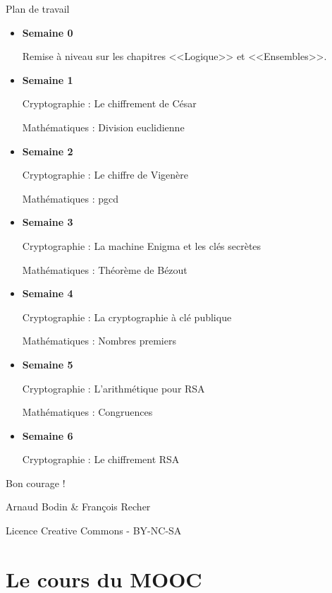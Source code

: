 {\bigskip

Plan de travail
\begin{itemize}
  \item \textbf{\color{blue} Semaine 0} 
  
  Remise à niveau sur les chapitres <<Logique>> et <<Ensembles>>.
  
  \item \textbf{\color{blue} Semaine 1} 
  
  Cryptographie : Le chiffrement de César
  
  Mathématiques : Division euclidienne
  
  \item \textbf{\color{blue} Semaine 2} 
  
  Cryptographie : Le chiffre de Vigenère
  
  Mathématiques : pgcd
  
  \item \textbf{\color{blue} Semaine 3}
  
  Cryptographie : La machine Enigma et les clés secrètes
  
  Mathématiques : Théorème de Bézout 
  
  \item \textbf{\color{blue} Semaine 4}
  
  Cryptographie : La cryptographie à clé publique
  
  Mathématiques : Nombres premiers  
  
  \item \textbf{\color{blue} Semaine 5}
  
  Cryptographie : L'arithmétique pour RSA
  
  Mathématiques : Congruences  
  
  \item \textbf{\color{blue} Semaine 6}
  
  Cryptographie : Le chiffrement RSA

\end{itemize}

\bigskip
\bigskip
\bigskip

\hfil\hfil Bon courage ! 

\hfil\hfil Arnaud Bodin \& François Recher

}%

\vfill
\centerline{Licence Creative Commons - BY-NC-SA}

\newpage



\part{Le cours du MOOC}

